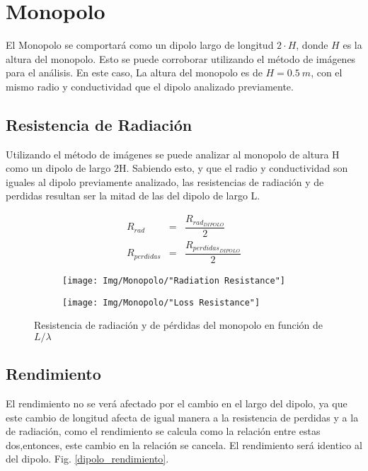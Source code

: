 \documentclass{article}
\begin{document}
\section{Monopolo}

El Monopolo se comportará como un dipolo largo de longitud $2 \cdot H$, donde $H$ es la altura del monopolo. Esto se puede corroborar utilizando el método de imágenes para el análisis. En este caso, La altura del monopolo es de $H = 0.5\:m$, con el mismo radio y conductividad que el dipolo analizado previamente. 

\subsection{Resistencia de Radiación}
Utilizando el método de imágenes se puede analizar al monopolo de altura H como un dipolo de largo 2H. Sabiendo esto, y que el radio y conductividad son iguales al dipolo previamente analizado, las resistencias de radiación y de perdidas resultan ser la mitad de las del dipolo de largo L.

\begin{eqnarray}
    R_{rad} & = &\dfrac{R_{rad_{DIPOLO}}}{2} \\
    R_{perdidas} & = &\dfrac{R_{perdidas_{DIPOLO}}}{2} 
\end{eqnarray}


\begin{figure}[H]

    \begin{subfigure}{0.5\textwidth}
        \centering
        \texttt{[image: Img/Monopolo/"Radiation Resistance"]}
    \end{subfigure}
    \begin{subfigure}{0.5\textwidth}
        \centering
        \texttt{[image: Img/Monopolo/"Loss Resistance"]}
    \end{subfigure}
        \caption{Resistencia de radiación y de pérdidas del monopolo en función de $L/\lambda$}
\end{figure}

\subsection{Rendimiento}

El rendimiento no se verá afectado por el cambio en el largo del dipolo, ya que este cambio de longitud afecta de igual manera a la resistencia de perdidas y a la de radiación, como el rendimiento se calcula como la relación entre estas dos,entonces, este cambio en la relación se cancela. El rendimiento será identico al del dipolo. Fig. \ref{dipolo_rendimiento}.
\end{document}
